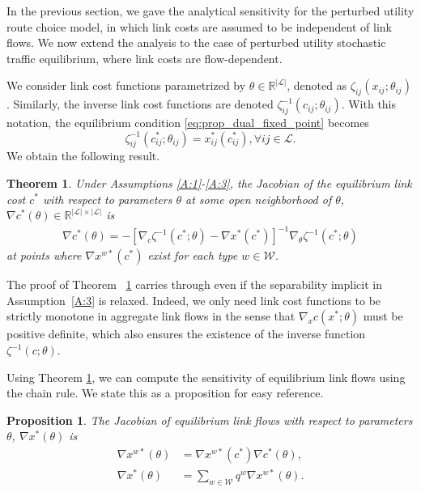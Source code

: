 \documentclass[a4paper,11pt]{article}
\newtheorem{proposition}{Proposition}
\newtheorem{theorem}{Theorem}
\begin{document}
In the previous section, we gave the analytical sensitivity for the perturbed utility route choice model, in which link costs are assumed to be independent of link flows. We now extend the analysis to the case of perturbed utility stochastic traffic equilibrium, where link costs are flow-dependent. 

We consider link cost functions parametrized by $\theta \in \mathbb{R}^{|\mathcal{L}|}$, denoted as $\zeta_{ij}(x_{ij}; \theta_{ij})$. Similarly, the inverse link cost functions are denoted  $\zeta^{-1}_{ij}(c_{ij}; \theta_{ij})$.  With this notation, the equilibrium condition \eqref{eq:prop_dual_fixed_point} becomes
\begin{equation}\label{eq:parametric_fixed_point}
   \zeta_{ij}^{-1}(c^*_{ij}; \theta_{ij}) = x^*_{ij}(c_{ij}^*), \forall ij \in \mathcal{L}.
\end{equation}
We obtain the following result.
\begin{theorem}
    \label{prop:jacobian_equilibrium_cost}
    Under Assumptions \ref{A:1}-\ref{A:3}, the Jacobian of the equilibrium link cost $c^*$ with respect to parameters $\theta$ at some open neighborhood of $\theta$, $\nabla c^*(\theta) \in \mathbb{R}^{|\mathcal{L}|\times |\mathcal{L}|}$ is
    \begin{align}
        \nabla c^*(\theta) = -\left[\nabla_{c} \zeta^{-1}(c^*; \theta) -  \nabla x^{*}(c^*)\right]^{-1} \nabla_{\theta} \zeta^{-1}(c^*; \theta)
    \end{align}
    at points where $\nabla x^{w*}(c^*)$ exist for each type $w\in\mathcal{W}$.
\end{theorem}

The proof of Theorem ~\ref{prop:jacobian_equilibrium_cost} carries through even if the separability implicit in Assumption~\ref{A:3} is relaxed. Indeed, we only need link cost functions to be strictly monotone in aggregate link flows in the sense that $\nabla_{x} c(x^*; \theta)$ must be positive definite, which also ensures the existence of the inverse function $\zeta^{-1}(c; \theta)$.

Using  Theorem \ref{prop:jacobian_equilibrium_cost}, we can compute the sensitivity of equilibrium link flows using the chain rule. We state this as a proposition for easy reference.
\begin{proposition}
   The Jacobian of equilibrium link flows with respect to parameters $\theta$, $\nabla x^*(\theta)$ is 
    \begin{align}
        \nabla x^{w*}(\theta) &= \nabla x^{w*}(c^*) \nabla c^*(\theta), \\
        \nabla x^{*}(\theta) &= \sum_{w\in\mathcal{W}}q^w \nabla x^{w*}(\theta).
        \label{eq:total_sensitivity}
    \end{align}
\end{proposition}
\end{document}
